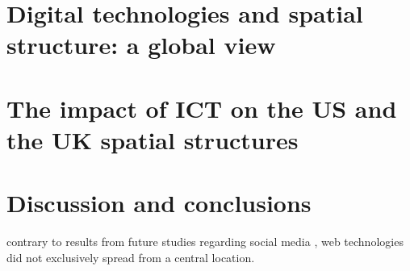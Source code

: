 \documentclass[preprint, 3p,
authoryear]{elsarticle} %
\begin{document}
\hypertarget{sec4}{%
\section{Digital technologies and spatial structure: a global
view}\label{sec4}}

\hypertarget{sec5}{%
\section{The impact of ICT on the US and the UK spatial
structures}\label{sec5}}

\hypertarget{sec6}{%
\section{Discussion and conclusions}\label{sec6}}

contrary to results from future studies regarding social media
\citep{lengyel2020role}, web technologies did not exclusively spread
from a central location.

\renewcommand\refname{References}

\end{document}
